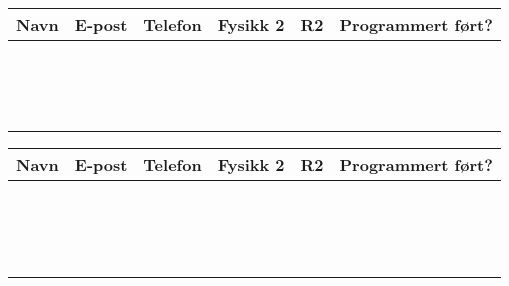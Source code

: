 \documentclass[a4paper, 12pt, notitlepage, english, landscape]{article}
\begin{document}
\pagestyle{empty}
\begin{center}
\begin{tabular}{c|c|c|l|l|l}
\qquad Navn \qquad\qquad & \qquad \qquad E-post \qquad\qquad\qquad\qquad \qquad\qquad\qquad & \qquad Telefon \qquad\qquad & Fysikk 2 & \qquad R2 \qquad \qquad & Programmert ført? \\ \hline
& & & & &\\ \hline
& & & & &\\ \hline
& & & & &\\ \hline
& & & & &\\ \hline
& & & & &\\ \hline
& & & & &\\ \hline
& & & & &\\ \hline
& & & & &\\ \hline
& & & & &\\ \hline
& & & & &\\ \hline
& & & & &\\ \hline
& & & & &\\ \hline
& & & & &\\ \hline
& & & & &\\ \hline
& & & & & \\
\end{tabular}
\end{center}

\begin{center}
\begin{tabular}{c|c|c|l|l|l}
\qquad Navn \qquad\qquad & \qquad \qquad E-post \qquad\qquad\qquad\qquad \qquad\qquad\qquad & \qquad Telefon \qquad\qquad & Fysikk 2 & \qquad R2 \qquad\qquad & Programmert ført? \\ \hline
& & & & &\\ \hline
& & & & &\\ \hline
& & & & &\\ \hline
& & & & &\\ \hline
& & & & &\\ \hline
& & & & &\\ \hline
& & & & &\\ \hline
& & & & &\\ \hline
& & & & &\\ \hline
& & & & &\\ \hline
& & & & &\\ \hline
& & & & &\\ \hline
& & & & &\\ \hline
& & & & &\\ \hline
& & & & &\\ \hline
& & & & & \\
\end{tabular}
\end{center}
\end{document}
